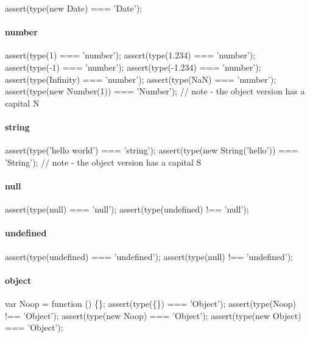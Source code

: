 \begin{DoxyCode}
assert(type(new Date) === 'Date');
\end{DoxyCode}


\paragraph*{number}


\begin{DoxyCode}
assert(type(1) === 'number');
assert(type(1.234) === 'number');
assert(type(-1) === 'number');
assert(type(-1.234) === 'number');
assert(type(Infinity) === 'number');
assert(type(NaN) === 'number');
assert(type(new Number(1)) === 'Number'); // note - the object version has a capital N
\end{DoxyCode}


\paragraph*{string}


\begin{DoxyCode}
assert(type('hello world') === 'string');
assert(type(new String('hello')) === 'String'); // note - the object version has a capital S
\end{DoxyCode}


\paragraph*{null}


\begin{DoxyCode}
assert(type(null) === 'null');
assert(type(undefined) !== 'null');
\end{DoxyCode}


\paragraph*{undefined}


\begin{DoxyCode}
assert(type(undefined) === 'undefined');
assert(type(null) !== 'undefined');
\end{DoxyCode}


\paragraph*{object}


\begin{DoxyCode}
var Noop = function () \{\};
assert(type(\{\}) === 'Object');
assert(type(Noop) !== 'Object');
assert(type(new Noop) === 'Object');
assert(type(new Object) === 'Object');
\end{DoxyCode}


